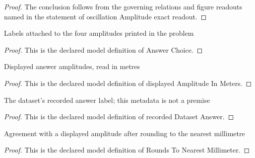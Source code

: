\begin{proof}
  The conclusion follows from the governing relations and figure readouts named in the statement of oscillation Amplitude exact readout.
\end{proof}
\begin{definition}
  \label{def:physics:phyx-mini-0260:phyxminiproblems-problemphyxmini0260-answerchoice}
  Labels attached to the four amplitudes printed in the problem
\end{definition}
\begin{proof}
  This is the declared model definition of Answer Choice.
\end{proof}
\begin{definition}
  \label{def:physics:phyx-mini-0260:phyxminiproblems-problemphyxmini0260-displayedamplitudeinmeters}
  Displayed answer amplitudes, read in metres
\end{definition}
\begin{proof}
  This is the declared model definition of displayed Amplitude In Meters.
\end{proof}
\begin{definition}
  \label{def:physics:phyx-mini-0260:phyxminiproblems-problemphyxmini0260-recordeddatasetanswer}
  The dataset's recorded answer label; this metadata is not a premise
\end{definition}
\begin{proof}
  This is the declared model definition of recorded Dataset Answer.
\end{proof}
\begin{definition}
  \label{def:physics:phyx-mini-0260:phyxminiproblems-problemphyxmini0260-roundstonearestmillimeter}
  Agreement with a displayed amplitude after rounding to the nearest millimetre
\end{definition}
\begin{proof}
  This is the declared model definition of Rounds To Nearest Millimeter.
\end{proof}
